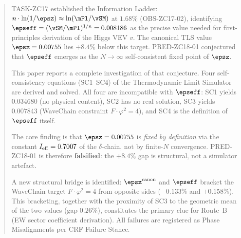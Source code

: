\documentclass[12pt, a4paper]{article}
\begin{document}


\begin{abstract}
\sloppy
TASK-ZC17 established the Information Ladder:
$n\cdot\ln(1/\epsz)\approx\ln(\mPl/\vSM)$ at $1.68\%$ (OBS-ZC17-02),
identifying $\epseff = (\vSM/\mPl)^{1/n} = 0.008186$ as the precise
value needed for first-principles derivation of the Higgs VEV $v$.
The canonical TLS value $\epsz = 0.00755$ lies $+8.4\%$ below this target.
PRED-ZC18-01 conjectured that $\epseff$ emerges as the $N\to\infty$
self-consistent fixed point of $\epsz$.

This paper reports a complete investigation of that conjecture.
Four self-consistency equations (SC1--SC4) of the
Thermodynamic Limit Simulator are derived and solved.
All four are incompatible with $\epseff$: SC1 yields $0.034680$
(no physical content), SC2 has no real solution, SC3 yields
$0.007843$ (WaveChain constraint $F\cdot\varphi^2=4$), and SC4 is
the definition of $\epseff$ itself.

The core finding is that $\epsz = 0.00755$ is \emph{fixed by
definition} via the constant $I_{\rm eff} = 0.7007$ of the
$\delta$-chain, not by finite-$N$ convergence.
PRED-ZC18-01 is therefore \textbf{falsified}: the $+8.4\%$ gap is
structural, not a simulator artefact.

A new structural bridge is identified: $\epsz^{\rm canon}$ and
$\epseff$ bracket the WaveChain target $F\cdot\varphi^2=4$
from opposite sides ($-0.133\%$ and $+0.158\%$).
This bracketing, together with the proximity of SC3 to the
geometric mean of the two values (gap $0.26\%$), constitutes
the primary clue for Route~B (EW sector coefficient derivation).
All failures are registered as Phase Misalignments per CRF
Failure Stance.
\end{abstract}
\end{document}
